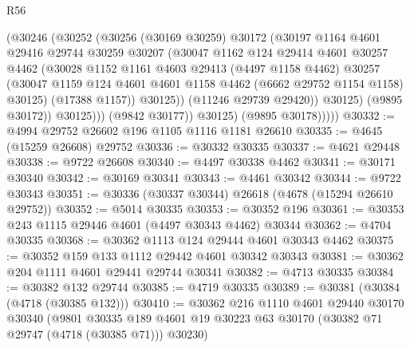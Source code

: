 \begin{lexlean}{R56}
\begin{coremodule}
                      (@30246
                        (@30252
                          (@30256
                            (@30169 @30259)
                            @30172
                            (@30197
                              @1164
                              @4601
                              @29416
                              @29744
                              @30259
                              @30207
                              (@30047
                                @1162
                                @124
                                @29414
                                @4601
                                @30257
                                @4462
                                (@30028
                                  @1152
                                  @1161
                                  @4603
                                  @29413
                                  (@4497 @1158 @4462)
                                  @30257
                                  (@30047
                                    @1159
                                    @124
                                    @4601
                                    @4601
                                    @1158
                                    @4462
                                    (@6662 @29752 @1154 @1158)
                                    @30125)
                                  (@17388 @1157))
                                @30125))
                            (@11246 @29739 @29420))
                          @30125)
                        (@9895 @30172))
                      @30125)))
                (@9842 @30177))
              @30125)
            (@9895 @30178)))))
@30332 := @4994 @29752 @26602 @196 @1105 @1116 @1181 @26610
@30335 := @4645 (@15259 @26608) @29752
@30336 := @30332 @30335
@30337 := @4621 @29448
@30338 := @9722 @26608
@30340 := @4497 @30338 @4462
@30341 := @30171 @30340
@30342 := @30169 @30341
@30343 := @4461 @30342
@30344 := @9722 @30343
@30351 := @30336 (@30337 @30344) @26618 (@4678 (@15294 @26610 @29752))
@30352 := @5014 @30335
@30353 := @30352 @196
@30361 := @30353 @243 @1115 @29446 @4601 (@4497 @30343 @4462) @30344
@30362 := @4704 @30335
@30368 := @30362 @1113 @124 @29444 @4601 @30343 @4462
@30375 := @30352 @159 @133 @1112 @29442 @4601 @30342 @30343
@30381 := @30362 @204 @1111 @4601 @29441 @29744 @30341
@30382 := @4713 @30335
@30384 := @30382 @132 @29744
@30385 := @4719 @30335
@30389 := @30381 (@30384 (@4718 (@30385 @132)))
@30410 := @30362
    @216
    @1110
    @4601
    @29440
    @30170
    @30340
    (@9801 @30335 @189 @4601 @19 @30223 @63 @30170 (@30382 @71 @29747 (@4718 (@30385 @71))) @30230)

\end{coremodule}
\end{lexlean}
